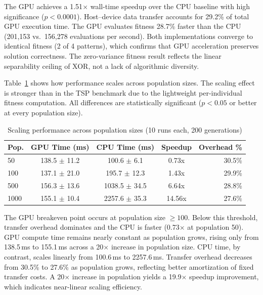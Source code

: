 \documentclass[a4paper,14pt]{extarticle}
\begin{document}
The GPU achieves a 1.51$\times$ wall-time speedup over the CPU baseline with high significance ($p < 0.0001$). Host--device data transfer accounts for 29.2\% of total GPU execution time. The GPU evaluates fitness 28.7\% faster than the CPU (201,153 vs.\ 156,278 evaluations per second). Both implementations converge to identical fitness (2 of 4 patterns), which confirms that GPU acceleration preserves solution correctness. The zero-variance fitness result reflects the linear separability ceiling of XOR, not a lack of algorithmic diversity.


Table~\ref{tab:scaling_results} shows how performance scales across population sizes. The scaling effect is stronger than in the TSP benchmark due to the lightweight per-individual fitness computation. All differences are statistically significant ($p < 0.05$ or better at every population size).

\begin{table}[H]
\centering
\caption{Scaling performance across population sizes (10 runs each, 200 generations)}
\label{tab:scaling_results}
\begin{tabular}{@{}lcccr@{}}
\toprule
\textbf{Pop.} & \textbf{GPU Time (ms)} & \textbf{CPU Time (ms)} & \textbf{Speedup} & \textbf{Overhead \%} \\
\midrule
50 & 138.5 $\pm$ 11.2 & 100.6 $\pm$ 6.1 & 0.73x & 30.5\% \\
100 & 137.1 $\pm$ 21.0 & 195.7 $\pm$ 12.3 & 1.43x & 29.9\% \\
500 & 156.3 $\pm$ 13.6 & 1038.5 $\pm$ 34.5 & 6.64x & 28.8\% \\
1000 & 155.1 $\pm$ 10.4 & 2257.6 $\pm$ 35.3 & 14.56x & 27.6\% \\
\bottomrule
\end{tabular}
\end{table}

The GPU breakeven point occurs at population size $\geq 100$. Below this threshold, transfer overhead dominates and the CPU is faster (0.73$\times$ at population 50). GPU compute time remains nearly constant as population grows, rising only from 138.5\,ms to 155.1\,ms across a 20$\times$ increase in population size. CPU time, by contrast, scales linearly from 100.6\,ms to 2257.6\,ms. Transfer overhead decreases from 30.5\% to 27.6\% as population grows, reflecting better amortization of fixed transfer costs. A 20$\times$ increase in population yields a 19.9$\times$ speedup improvement, which indicates near-linear scaling efficiency.
\end{document}

